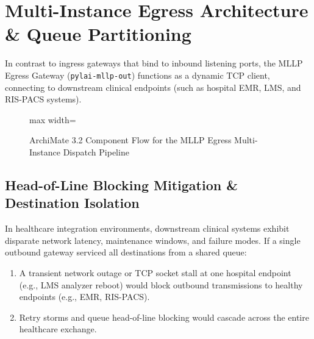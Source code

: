 \section{Multi-Instance Egress Architecture \& Queue Partitioning}
\label{sec:egress_architecture}

In contrast to ingress gateways that bind to inbound listening ports, the MLLP Egress Gateway (\texttt{pylai-mllp-out}) functions as a dynamic TCP client, connecting to downstream clinical endpoints (such as hospital EMR, LMS, and RIS-PACS systems).

\begin{figure}[htbp]
    \centering
    \begin{adjustbox}{max width=\textwidth}
        
    \end{adjustbox}
    \caption{ArchiMate 3.2 Component Flow for the MLLP Egress Multi-Instance Dispatch Pipeline}
    \label{fig:mllp_egress_process}
\end{figure}

\subsection{Head-of-Line Blocking Mitigation \& Destination Isolation}

In healthcare integration environments, downstream clinical systems exhibit disparate network latency, maintenance windows, and failure modes. If a single outbound gateway serviced all destinations from a shared queue:
\begin{enumerate}
    \item A transient network outage or TCP socket stall at one hospital endpoint (e.g., LMS analyzer reboot) would block outbound transmissions to healthy endpoints (e.g., EMR, RIS-PACS).
    \item Retry storms and queue head-of-line blocking would cascade across the entire healthcare exchange.
\end{enumerate}

